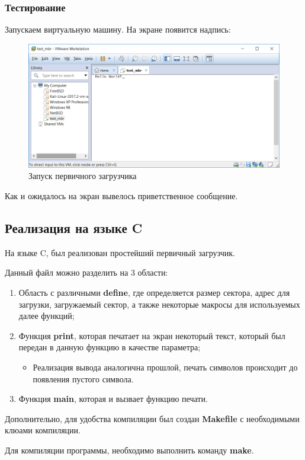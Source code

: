 \subsubsection{Тестирование}
Запускаем виртуальную машину. На экране появится надпись:
\begin{figure}[H]
  \centering
  \includegraphics[width=.8\textwidth]{img/p1/5}
  \caption{Запуск первичного загрузчика}
\end{figure}
Как и ожидалось на экран вывелось приветственное сообщение. 

\subsection{Реализация на языке C}
На языке C, был реализован простейший первичный загрузчик.

Данный файл можно разделить на 3 области:
\begin{enumerate}
\item Область с различными \textbf{define}, где определяется размер сектора, адрес для загрузки, загружаемый сектор, а также некоторые макросы для используемых далее функций;
\item Функция \textbf{print}, которая печатает на экран некоторый текст, который был передан в данную функцию в качестве параметра;
\begin{itemize}
\item Реализация вывода аналогична прошлой, печать символов происходит до появления пустого символа.
\end{itemize}
\item Функция \textbf{main}, которая и вызвает функцию печати.
\end{enumerate}
Дополнительно, для удобства компиляции был создан \textbf{Makefile} с необходимыми клюами компиляции.


Для компиляции программы, необходимо выполнить команду \textbf{make}.

